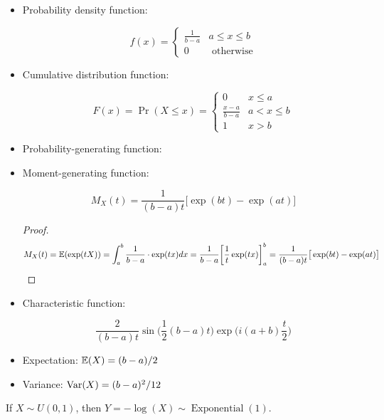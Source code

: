 \begin{itemize}

\item Probability density function: 

\[
f(x) = \begin{cases}
\frac{1}{b-a} & a \leq x \leq b \\
0 & \text{ otherwise}
\end{cases}
\]

\item Cumulative distribution function: 

\[
F(x) = \Pr(X \leq x) = \begin{cases}
0 & x \leq a \\
\frac{x-a}{b-a} & a < x \leq b \\
1 & x > b
\end{cases}
\]

\item Probability-generating function:

\item Moment-generating function: 

\[
M_X(t) = \frac{1}{(b-a)t} \big[ \exp(bt) - \exp(at) \big]
\]

\begin{proof}
\[
M_X(t) = \E(\exp(tX)) = \int_a^b \frac{1}{b-a} \cdot \exp(tx) dx = \frac{1}{b-a} \bigg[ \frac{1}{t} \exp(tx) \bigg]_a^b =  \frac{1}{(b-a)t} \big[ \exp(bt) - \exp(at) \big]
\]
\end{proof}

\item Characteristic function:

\[
\frac{2}{(b-a)t} \sin \bigg( \frac{1}{2} (b-a)t \bigg) \exp \bigg(i(a+b) \frac{t}{2} \bigg)
\]

%

\item Expectation: \(\E(X) = (b-a)/2\)

\item Variance: \(\Var(X) = (b - a)^2/12 \)

\end{itemize}

\begin{proposition}\label{prob.log.unif.exp}If \(X \sim U(0, 1)\), then \(Y = - \log(X) \sim \operatorname{Exponential}(1)\). 
\end{proposition}

